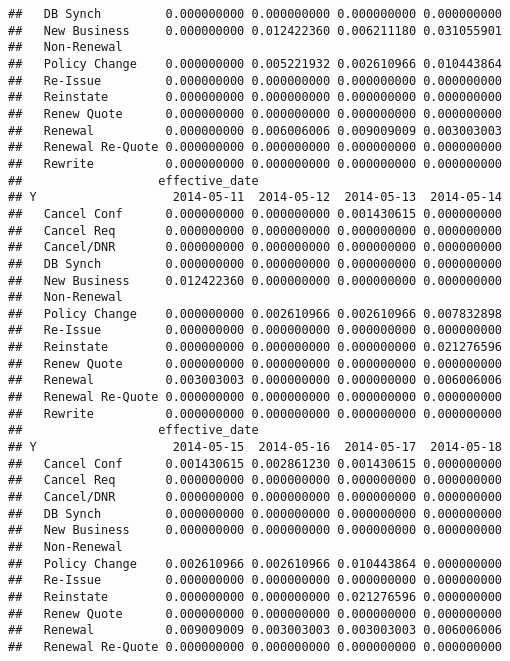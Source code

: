 \documentclass[]{article}
\begin{document}
\begin{verbatim}
##   DB Synch         0.000000000 0.000000000 0.000000000 0.000000000
##   New Business     0.000000000 0.012422360 0.006211180 0.031055901
##   Non-Renewal                                                     
##   Policy Change    0.000000000 0.005221932 0.002610966 0.010443864
##   Re-Issue         0.000000000 0.000000000 0.000000000 0.000000000
##   Reinstate        0.000000000 0.000000000 0.000000000 0.000000000
##   Renew Quote      0.000000000 0.000000000 0.000000000 0.000000000
##   Renewal          0.000000000 0.006006006 0.009009009 0.003003003
##   Renewal Re-Quote 0.000000000 0.000000000 0.000000000 0.000000000
##   Rewrite          0.000000000 0.000000000 0.000000000 0.000000000
##                   effective_date
## Y                   2014-05-11  2014-05-12  2014-05-13  2014-05-14
##   Cancel Conf      0.000000000 0.000000000 0.001430615 0.000000000
##   Cancel Req       0.000000000 0.000000000 0.000000000 0.000000000
##   Cancel/DNR       0.000000000 0.000000000 0.000000000 0.000000000
##   DB Synch         0.000000000 0.000000000 0.000000000 0.000000000
##   New Business     0.012422360 0.000000000 0.000000000 0.000000000
##   Non-Renewal                                                     
##   Policy Change    0.000000000 0.002610966 0.002610966 0.007832898
##   Re-Issue         0.000000000 0.000000000 0.000000000 0.000000000
##   Reinstate        0.000000000 0.000000000 0.000000000 0.021276596
##   Renew Quote      0.000000000 0.000000000 0.000000000 0.000000000
##   Renewal          0.003003003 0.000000000 0.000000000 0.006006006
##   Renewal Re-Quote 0.000000000 0.000000000 0.000000000 0.000000000
##   Rewrite          0.000000000 0.000000000 0.000000000 0.000000000
##                   effective_date
## Y                   2014-05-15  2014-05-16  2014-05-17  2014-05-18
##   Cancel Conf      0.001430615 0.002861230 0.001430615 0.000000000
##   Cancel Req       0.000000000 0.000000000 0.000000000 0.000000000
##   Cancel/DNR       0.000000000 0.000000000 0.000000000 0.000000000
##   DB Synch         0.000000000 0.000000000 0.000000000 0.000000000
##   New Business     0.000000000 0.000000000 0.000000000 0.000000000
##   Non-Renewal                                                     
##   Policy Change    0.002610966 0.002610966 0.010443864 0.000000000
##   Re-Issue         0.000000000 0.000000000 0.000000000 0.000000000
##   Reinstate        0.000000000 0.000000000 0.021276596 0.000000000
##   Renew Quote      0.000000000 0.000000000 0.000000000 0.000000000
##   Renewal          0.009009009 0.003003003 0.003003003 0.006006006
##   Renewal Re-Quote 0.000000000 0.000000000 0.000000000 0.000000000

\end{verbatim}
\end{document}
